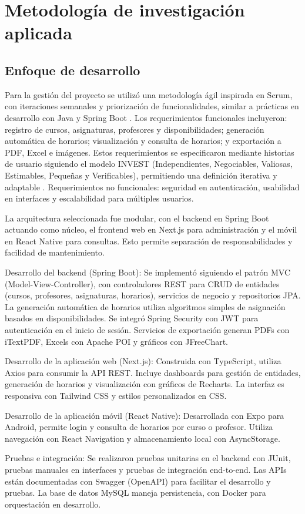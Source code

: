 \section{Metodología de investigación aplicada}
\subsection{Enfoque de desarrollo}
Para la gestión del proyecto se utilizó una metodología ágil inspirada en Scrum, con iteraciones semanales y priorización de funcionalidades, similar a prácticas en desarrollo con Java y Spring Boot \cite{arciniegas2025}. Los requerimientos funcionales incluyeron: registro de cursos, asignaturas, profesores y disponibilidades; generación automática de horarios; visualización y consulta de horarios; y exportación a PDF, Excel e imágenes. Estos requerimientos se especificaron mediante historias de usuario siguiendo el modelo INVEST (Independientes, Negociables, Valiosas, Estimables, Pequeñas y Verificables), permitiendo una definición iterativa y adaptable \cite{izaurralde2013}. Requerimientos no funcionales: seguridad en autenticación, usabilidad en interfaces y escalabilidad para múltiples usuarios.

La arquitectura seleccionada fue modular, con el backend en Spring Boot actuando como núcleo, el frontend web en Next.js para administración y el móvil en React Native para consultas. Esto permite separación de responsabilidades y facilidad de mantenimiento.

Desarrollo del backend (Spring Boot): Se implementó siguiendo el patrón MVC (Model-View-Controller), con controladores REST para CRUD de entidades (cursos, profesores, asignaturas, horarios), servicios de negocio y repositorios JPA. La generación automática de horarios utiliza algoritmos simples de asignación basados en disponibilidades. Se integró Spring Security con JWT para autenticación en el inicio de sesión. Servicios de exportación generan PDFs con iTextPDF, Excels con Apache POI y gráficos con JFreeChart.

Desarrollo de la aplicación web (Next.js): Construida con TypeScript, utiliza Axios para consumir la API REST. Incluye dashboards para gestión de entidades, generación de horarios y visualización con gráficos de Recharts. La interfaz es responsiva con Tailwind CSS y estilos personalizados en CSS.

Desarrollo de la aplicación móvil (React Native): Desarrollada con Expo para Android, permite login y consulta de horarios por curso o profesor. Utiliza navegación con React Navigation y almacenamiento local con AsyncStorage.

Pruebas e integración: Se realizaron pruebas unitarias en el backend con JUnit, pruebas manuales en interfaces y pruebas de integración end-to-end. Las APIs están documentadas con Swagger (OpenAPI) para facilitar el desarrollo y pruebas. La base de datos MySQL maneja persistencia, con Docker para orquestación en desarrollo.